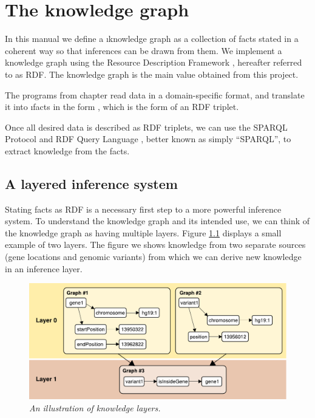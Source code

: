 \chapter{The knowledge graph}
\label{chap:knowledge-graph}

  In this manual we define a \i{knowledge graph} as a collection of
  facts stated in a coherent way so that inferences can be drawn from
  them.  We implement a knowledge graph using the Resource Description
  Framework \citep{Lassila-99-RDF}, hereafter referred to as RDF.  The
  knowledge graph is the main value obtained from this project.

  The programs from chapter  read data in a
  domain-specific format, and translate it into \i{facts} in the form
  , which is the form of an RDF triplet.

  Once all desired data is described as RDF triplets, we can use the SPARQL
  Protocol and RDF Query Language \citep{sparql-11}, better known as simply
  ``SPARQL'', to extract knowledge from the facts.

\section{A layered inference system}

  Stating facts as RDF is a necessary first step to a more powerful inference
  system.  To understand the knowledge graph and its intended use, we can
  think of the knowledge graph as having multiple layers.  Figure
  \ref{fig:layered-knowledge} displays a small example of two layers.  The
  figure we shows knowledge from two separate sources (gene locations and
  genomic variants) from which we can derive new knowledge in an inference
  layer.

  \begin{figure}[H]
    \begin{center}
    \includegraphics[width=1.0\textwidth]{figures/layered-knowledge.pdf}
    \end{center}
    \caption{\textit{An illustration of knowledge layers.}}
    \label{fig:layered-knowledge}
  \end{figure}

